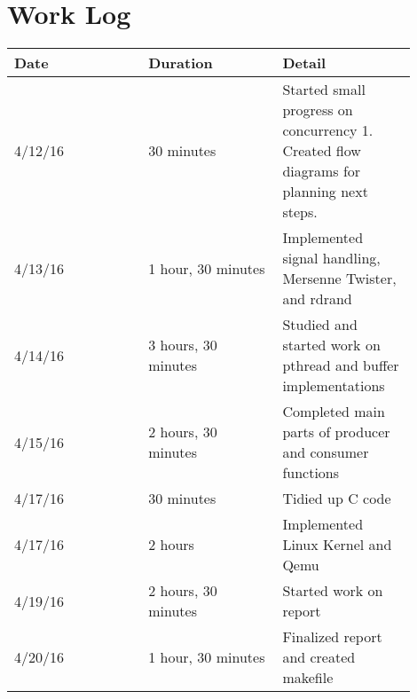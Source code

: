 \documentclass[letterpaper,10pt,draftclsnofoot,onecolumn]{IEEEtran}
\begin{document}
\section{Work Log}
\begin{tabular}{|p{0.3\linewidth}|p{0.3\linewidth}|p{0.3\linewidth}|}
\hline
\textbf{Date}&\textbf{Duration}&\textbf{Detail}\\
\hline
4/12/16 & 30 minutes & Started small progress on concurrency 1. Created flow diagrams for planning next steps.\\
\hline
4/13/16 & 1 hour, 30 minutes & Implemented signal handling, Mersenne Twister, and rdrand \\
\hline
4/14/16 & 3 hours, 30 minutes & Studied and started work on pthread and buffer implementations \\
\hline
4/15/16 & 2 hours, 30 minutes & Completed main parts of producer and consumer functions \\
\hline
4/17/16 & 30 minutes & Tidied up C code \\
\hline
4/17/16 & 2 hours & Implemented Linux Kernel and Qemu \\
\hline
4/19/16 & 2 hours, 30 minutes & Started work on report \\
\hline
4/20/16 & 1 hour, 30 minutes & Finalized report and created makefile \\
\end{tabular}
\end{document}
